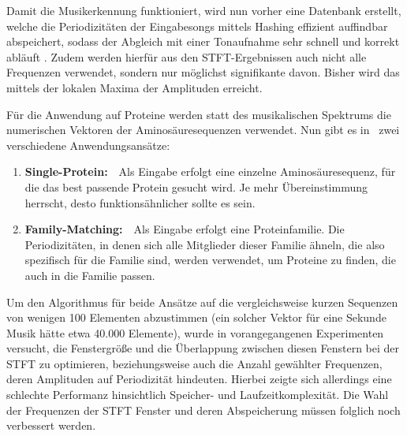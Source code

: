     Damit die Musikerkennung funktioniert, wird nun vorher eine Datenbank erstellt, welche die Periodizitäten der Eingabesongs mittels Hashing effizient auffindbar abspeichert, sodass der Abgleich mit einer Tonaufnahme sehr schnell und korrekt abläuft . Zudem werden hierfür aus den STFT-Ergebnissen auch nicht alle Frequenzen verwendet, sondern nur möglichst signifikante davon. Bisher wird das mittels der lokalen Maxima der Amplituden erreicht.

    Für die Anwendung auf Proteine werden statt des musikalischen Spektrums die numerischen Vektoren der Aminosäuresequenzen verwendet. Nun gibt es in \protfin\ zwei verschiedene Anwendungsansätze:
    \begin{enumerate}
        \item \textbf{Single-Protein:}\ \ Als Eingabe erfolgt eine einzelne Aminosäuresequenz, für die das best passende Protein gesucht wird. Je mehr Übereinstimmung herrscht, desto funktionsähnlicher sollte es sein.
        \item \textbf{Family-Matching:}\ \ Als Eingabe erfolgt eine Proteinfamilie. Die Periodizitäten, in denen sich alle Mitglieder dieser Familie ähneln, die also spezifisch für die Familie sind, werden verwendet, um Proteine zu finden, die auch in die Familie passen.
    \end{enumerate}
    Um den Algorithmus für beide Ansätze auf die vergleichsweise kurzen Sequenzen von wenigen 100 Elementen abzustimmen (ein solcher Vektor für eine Sekunde Musik hätte etwa 40.000 Elemente), wurde in vorangegangenen Experimenten versucht, die Fenstergröße und die Überlappung zwischen diesen Fenstern bei der STFT zu optimieren, beziehungsweise auch die Anzahl gewählter Frequenzen, deren Amplituden auf Periodizität hindeuten. Hierbei zeigte sich allerdings eine schlechte Performanz hinsichtlich Speicher- und Laufzeitkomplexität. Die Wahl der Frequenzen der STFT Fenster und deren Abspeicherung müssen folglich noch verbessert werden.

